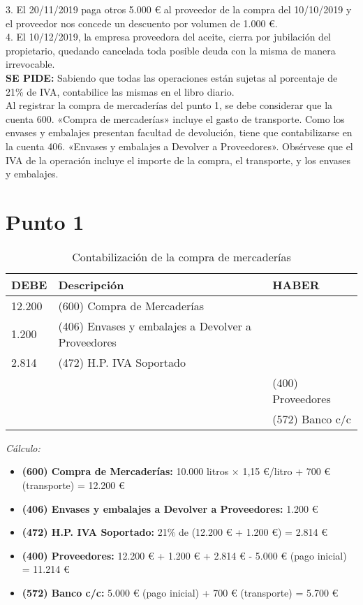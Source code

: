\documentclass{article}
\begin{document}
3. El 20/11/2019 paga otros 5.000 € al proveedor de la compra del 10/10/2019 y el proveedor nos concede un descuento por volumen de 1.000 €.\\

4. El 10/12/2019, la empresa proveedora del aceite, cierra por jubilación del propietario, quedando cancelada toda posible deuda con la misma de manera irrevocable.\\

\textbf{SE PIDE:} Sabiendo que todas las operaciones están sujetas al porcentaje de 21\% de IVA, contabilice las mismas en el libro diario.\\

Al registrar la compra de mercaderías del punto 1, se debe considerar que la cuenta 600. «Compra de mercaderías» incluye el gasto de transporte. Como los envases y embalajes presentan facultad de devolución, tiene que contabilizarse en la cuenta 406. «Envases y embalajes a Devolver a Proveedores». Obsérvese que el IVA de la operación incluye el importe de la compra, el transporte, y los envases y embalajes.\\

\section*{Punto 1}

\begin{table}[H]
\centering
\begin{tabular}{|p{4cm}|p{4cm}|p{4cm}|}
\hline
\textbf{DEBE} & \textbf{Descripción} & \textbf{HABER} \\
\hline
12.200 & (600) Compra de Mercaderías & \\
1.200 & (406) Envases y embalajes a Devolver a Proveedores & \\
2.814 & (472) H.P. IVA Soportado & \\
& & (400) Proveedores \\
& & (572) Banco c/c \\
\hline
\end{tabular}
\caption{Contabilización de la compra de mercaderías}
\end{table}

\textit{Cálculo:}
\begin{itemize}
    \item \textbf{(600) Compra de Mercaderías:} 10.000 litros \(\times\) 1,15 €/litro + 700 € (transporte) = 12.200 €
    \item \textbf{(406) Envases y embalajes a Devolver a Proveedores:} 1.200 €
    \item \textbf{(472) H.P. IVA Soportado:} 21\% de (12.200 € + 1.200 €) = 2.814 €
    \item \textbf{(400) Proveedores:} 12.200 € + 1.200 € + 2.814 € - 5.000 € (pago inicial) = 11.214 €
    \item \textbf{(572) Banco c/c:} 5.000 € (pago inicial) + 700 € (transporte) = 5.700 €
\end{itemize}
\end{document}
